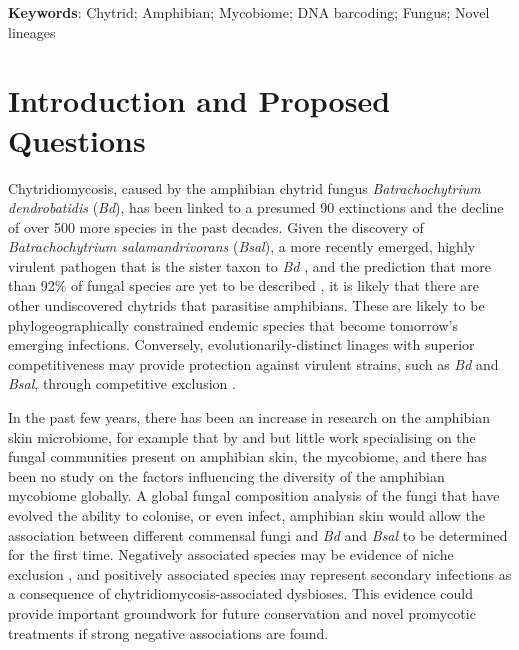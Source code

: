 \documentclass[11pt, a4paper, titlepage]{article}
\begin{document}



\noindent \textbf{Keywords}: Chytrid; Amphibian; Mycobiome; DNA barcoding; Fungus; Novel lineages

\section{Introduction and Proposed Questions}

\noindent Chytridiomycosis, caused by the amphibian chytrid fungus \textit{Batrachochytrium dendrobatidis} (\textit{Bd}), has been linked to a presumed 90 extinctions and the decline of over 500 more species in the past decades\parencite{Scheele2019}. Given the discovery of \textit{Batrachochytrium salamandrivorans} (\textit{Bsal}), a more recently emerged, highly virulent pathogen that is the sister taxon to \textit{Bd} \parencite{Martel2013}, and the prediction that more than 92\% of fungal species are yet to be described \parencite{hawksworth2017fungal}, it is likely that there are other undiscovered chytrids that parasitise amphibians. These are likely to be phylogeographically constrained endemic species that become tomorrow's emerging infections. Conversely, evolutionarily-distinct linages with superior competitiveness may provide protection against virulent strains, such as \textit{Bd} and \textit{Bsal}, through competitive exclusion \parencite{Hardin1960}. \newline

\noindent In the past few years, there has been an increase in research on the amphibian skin microbiome, for example that by \parencite{Bates2018} and \parencite{Bates2019} but little work specialising on the fungal communities present on amphibian skin, the mycobiome, and there has been no study on the factors influencing the diversity of the amphibian mycobiome globally. A global fungal composition analysis of the fungi that have evolved the ability to colonise, or even infect, amphibian skin would allow the association between different commensal fungi and \textit{Bd} and \textit{Bsal} to be determined for the first time. Negatively associated species may be evidence of niche exclusion \parencite{Hardin1960}, and positively associated species may represent secondary infections as a consequence of chytridiomycosis-associated dysbioses. This evidence could provide important groundwork for future conservation and novel promycotic treatments if strong negative associations are found.
\end{document}

